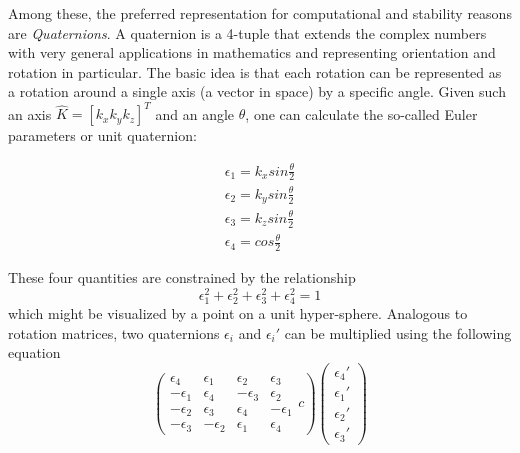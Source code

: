 Among these, the preferred representation for computational and stability reasons are \emph{Quaternions}. A quaternion is a 4-tuple that extends the complex numbers with very general applications in mathematics and representing orientation and rotation in particular. The basic idea is that each rotation can be represented as a rotation around a single axis (a vector in space) by a specific angle. Given such an axis $ \hat{K}=[k_x k_y k_z]^T$ and an angle $ \theta$, one can calculate the so-called Euler parameters or unit quaternion:

\begin{eqnarray}
\epsilon_1=k_x sin \frac{\theta}{2}\\
\epsilon_2=k_y sin \frac{\theta}{2}\\
\epsilon_3=k_z sin \frac{\theta}{2}\\
\epsilon_4=cos\frac{\theta}{2}
\end{eqnarray}

These four quantities are constrained by the relationship
\begin{equation}
\epsilon_1^2+\epsilon_2^2+\epsilon_3^2+\epsilon_4^2=1
\end{equation}
which might be visualized by a point on a unit hyper-sphere. %
Analogous to rotation matrices, two quaternions $\epsilon_i$ and $\epsilon_i'$ can be multiplied using the following equation
\begin{equation}
\left(
\begin{array}{cccc}
\epsilon_4 & \epsilon_1 & \epsilon_2 & \epsilon_3\\
-\epsilon_1 & \epsilon_4 & -\epsilon_3 & \epsilon_2\\
-\epsilon_2 & \epsilon_3 & \epsilon_4 & -\epsilon_1\\
-\epsilon_3 & -\epsilon_2 & \epsilon_1 & \epsilon_4
\end{array}{c}
\right)
\left(\begin{array}{c}\epsilon_4'\\\epsilon_1'\\\epsilon_2'\\\epsilon_3'\end{array}\right)
\end{equation}

